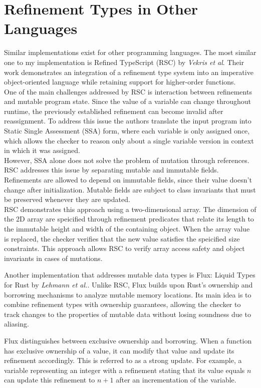 \section{Refinement Types in Other Languages}
\label{sec:existing_implementations}
Similar implementations exist for other programming languages. The most similar one to my implementation is
Refined TypeScript (RSC) \cite{vekrisRefinementTypesTypeScript2016} by \textit{Vekris et al}.
Their work demonstrates an integration of a refinement type system into an imperative object-oriented language while
retaining support for higher-order functions.
\\
One of the main challenges addressed by RSC is interaction between refinements and mutable
program state. Since the value of a variable can change throughout runtime, the previously
established refinement can become invalid after reassignment. To address this issue the 
authors translate the input program into Static Single Assessment (SSA) form, where each variable
is only assigned once, which allows the checker to reason only about a single variable version
in context in which it was assigned.
\\
However, SSA alone does not solve the problem of mutation through references.
RSC addresses this issue by separating mutable and immutable fields.
Refinements are allowed to depend on immutable fields, since their value doesn't change
after initialization. Mutable fields are subject to class invariants that must be preserved
whenever they are updated.
\\
RSC demonstrates this approach using a two-dimensional array.
The dimension of the 2D array are speicified through refinement
predicates that relate its length to the immutable height and width of the containing object.
When the array value is replaced, the checker verifies that the new value satisfies the speicified
size constraints. This approach allows RSC to
verify array access safety and object invariants in cases of mutations. \cite{vekrisRefinementTypesTypeScript2016}

Another implementation that addresses mutable data types is Flux: Liquid Types for Rust \cite{lehmannFluxLiquidTypes2023}
by \textit{Lehmann et al.}.
Unlike RSC, Flux builds upon Rust's ownership and borrowing mechanisms to
analyze mutable memory locations. Its main idea is to combine
refinement types with ownership guarantees, allowing the checker to track
changes to the properties of mutable data without losing soundness due to
aliasing.

Flux distinguishes between exclusive ownership and borrowing. When a
function has exclusive ownership of a value, it can modify that value and
update its refinement accordingly. This is referred to as a strong update.
For example, a variable representing an integer with a refinement stating
that its value equals \(n\) can update this refinement to \(n+1\) after an
incrementation of the variable.

